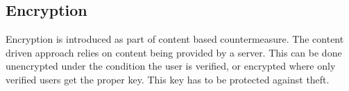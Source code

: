 \subsection{Encryption} \label{subsection:counter-replace-encryption}
Encryption is introduced as part of content based countermeasure.
The content driven approach relies on content being provided by a server.
This can be done unencrypted under the condition the user is verified, or encrypted where only verified users get the proper key.
This key has to be protected against theft.
